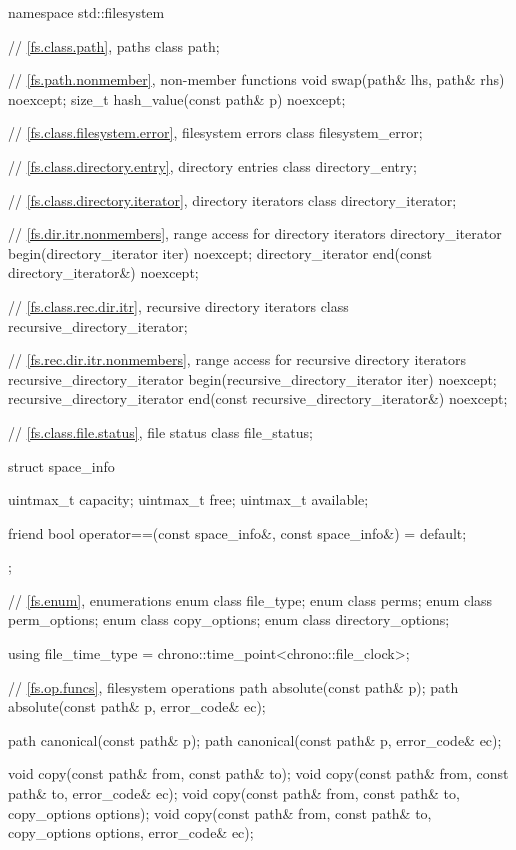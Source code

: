 %
\begin{codeblock}
namespace std::filesystem {
  // \ref{fs.class.path}, paths
  class path;

  // \ref{fs.path.nonmember},  non-member functions
  void swap(path& lhs, path& rhs) noexcept;
  size_t hash_value(const path& p) noexcept;

  // \ref{fs.class.filesystem.error}, filesystem errors
  class filesystem_error;

  // \ref{fs.class.directory.entry}, directory entries
  class directory_entry;

  // \ref{fs.class.directory.iterator}, directory iterators
  class directory_iterator;

  // \ref{fs.dir.itr.nonmembers}, range access for directory iterators
  directory_iterator begin(directory_iterator iter) noexcept;
  directory_iterator end(const directory_iterator&) noexcept;

  // \ref{fs.class.rec.dir.itr}, recursive directory iterators
  class recursive_directory_iterator;

  // \ref{fs.rec.dir.itr.nonmembers}, range access for recursive directory iterators
  recursive_directory_iterator begin(recursive_directory_iterator iter) noexcept;
  recursive_directory_iterator end(const recursive_directory_iterator&) noexcept;

  // \ref{fs.class.file.status}, file status
  class file_status;

  struct space_info {
    uintmax_t capacity;
    uintmax_t free;
    uintmax_t available;

    friend bool operator==(const space_info&, const space_info&) = default;
  };

  // \ref{fs.enum}, enumerations
  enum class file_type;
  enum class perms;
  enum class perm_options;
  enum class copy_options;
  enum class directory_options;

  using file_time_type = chrono::time_point<chrono::file_clock>;

  // \ref{fs.op.funcs}, filesystem operations
  path absolute(const path& p);
  path absolute(const path& p, error_code& ec);

  path canonical(const path& p);
  path canonical(const path& p, error_code& ec);

  void copy(const path& from, const path& to);
  void copy(const path& from, const path& to, error_code& ec);
  void copy(const path& from, const path& to, copy_options options);
  void copy(const path& from, const path& to, copy_options options,
            error_code& ec);

}
\end{codeblock}
